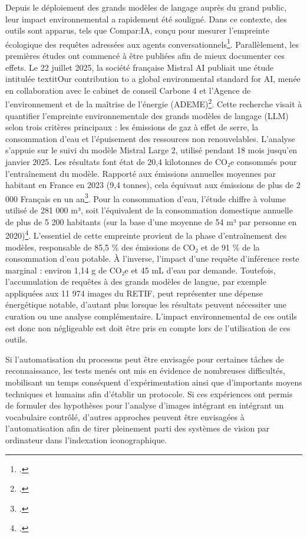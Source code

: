 Depuis le déploiement des grands modèles de langage auprès du grand public, leur impact environnemental a rapidement été souligné. Dans ce contexte, des outils sont apparus, tels que Compar:IA, conçu pour mesurer l’empreinte écologique des requêtes adressées aux agents conversationnels\footcite{ministeredelacultureComparIAComparateur2024}. Parallèlement, les premières études ont commencé à être publiées afin de mieux documenter ces effets. Le 22 juillet 2025, la société française Mistral AI publiait une étude intitulée textit{Our contribution to a global environmental standard for AI}, menée en collaboration avec le cabinet de conseil Carbone 4 et l’Agence de l'environnement et de la maîtrise de l'énergie (ADEME)\footcite{mistralaiOurContributionGlobal2025}. Cette recherche visait à quantifier l’empreinte environnementale des grands modèles de langage (LLM) selon trois critères principaux : les émissions de gaz à effet de serre, la consommation d’eau et l’épuisement des ressources non renouvelables. L’analyse s’appuie sur le suivi du modèle Mistral Large 2, utilisé pendant 18 mois jusqu’en janvier 2025. Les résultats font état de 20,4 kilotonnes de CO₂e consommés pour l'entraînement du modèle. Rapporté aux émissions annuelles moyennes par habitant en France en 2023 (9,4 tonnes), cela équivaut aux émissions de plus de 2 000 Français en un an\footcite{inseeEmissionsGazEffet2025}. Pour la consommation d’eau, l’étude chiffre à volume utilisé de 281 000 m³, soit l’équivalent de la consommation domestique annuelle de plus de 5 200 habitants (sur la base d’une moyenne de 54 m³ par personne en 2020)\footcite{commissariatgeneralaudeveloppementdurableConsommationDomestiqueEau2023}. L’essentiel de cette empreinte provient de la phase d’entraînement des modèles, responsable de 85,5 \% des émissions de CO₂ et de 91 \% de la consommation d’eau potable. À l’inverse, l’impact d’une requête d’inférence reste marginal : environ 1,14 g de CO₂e et 45 mL d’eau par demande. Toutefois, l’accumulation de requêtes à des grands modèles de langue, par exemple appliquées aux 11 974 images du RETIF, peut représenter une dépense énergétique notable, d’autant plus lorsque les résultats peuvent nécessiter une curation ou une analyse complémentaire. L’impact environnemental de ces outils est donc non négligeable est doit être pris en compte lors de l’utilisation de ces outils.

\bigskip

Si l’automatisation du processus peut être envisagée pour certaines tâches de reconnaissance, les tests menés ont mis en évidence de nombreuses difficultés, mobilisant un temps conséquent d’expérimentation ainsi que d’importants moyens techniques et humains afin d’établir un protocole. Si ces expériences ont permis de formuler des hypothèses pour l’analyse d’images intégrant en intégrant un vocabulaire contrôlé, d’autres approches peuvent être envisagées à l’automatisation afin de tirer pleinement parti des systèmes de vision par ordinateur dans l’indexation iconographique.